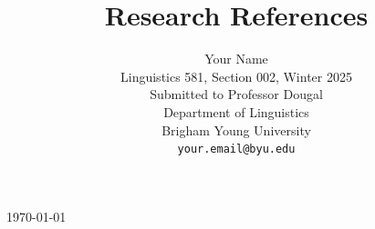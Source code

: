 \documentclass[11pt,table,xcdraw]{article}
\title{Research References}
\author{Your Name \\
  Linguistics 581, Section 002, Winter 2025 \\
  Submitted to Professor Dougal \\
  Department of Linguistics \\
  Brigham Young University \\
  {\tt your.email@byu.edu} }
\begin{document}
\maketitle

\today

\nocite{*}


\end{document}
